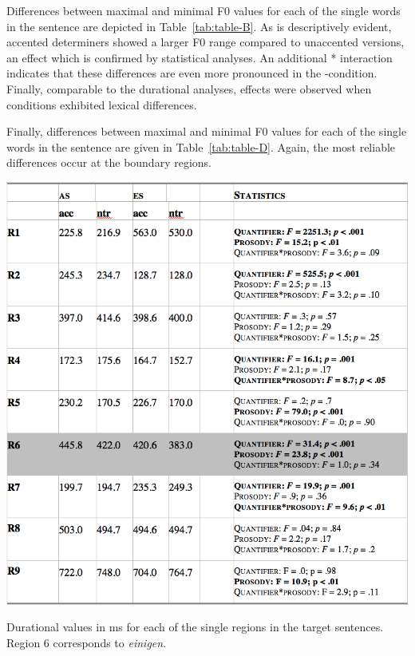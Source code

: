 \documentclass[fleqn,reqno,10pt,draft]{article}
\newcommand{\as}{\acro{as}}
\begin{document}
Differences between maximal and minimal F0 values for each of the
single words in the sentence are depicted in
Table~\ref{tab:table-B}. As is descriptively evident, accented
determiners showed a larger F0 range compared to unaccented versions,
an effect which is confirmed by statistical analyses. An additional
* interaction indicates that these
differences are even more pronounced in the \as-condition. Finally,
comparable to the durational analyses,  effects were
observed when conditions exhibited lexical differences.

Finally, differences between maximal and minimal F0 values for each of
the single words in the sentence are given in
Table~\ref{tab:table-D}. Again, the most reliable differences occur at
the boundary regions.


\begin{table}
  \centering
  
  \includegraphics[width=\textwidth]{../pictures/Acoustics/Table-A.png}

  \caption{Durational values in ms for each of the single regions in the target sentences. Region 6 corresponds to \emph{einigen}.}
  \label{tab:table-A}
\end{table}
\end{document}
